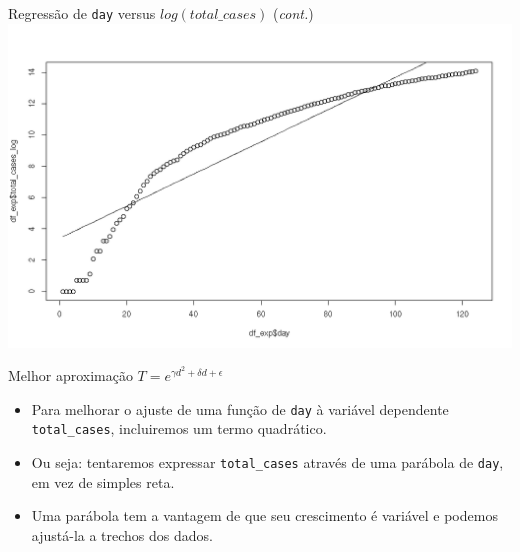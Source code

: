 \documentclass[a4paper,10pt]{beamer}
\begin{document}
\begin{frame}{ Regressão de {\tt day} versus $log(total\_cases)$
    ({\em cont.})}
  \includegraphics[scale=0.375]{plot-exp.png}
\end{frame}

%   
%   
% 
% 
% 

\begin{frame}{ Melhor aproximação $T = e^{\gamma d^2 + \delta d + \epsilon}$}
  \begin{itemize}
      \item Para melhorar o ajuste de uma função de {\tt day} à variável
	  dependente {\tt total\_cases}, incluiremos um termo quadrático.
      \item Ou seja: tentaremos expressar {\tt total\_cases} através de 
	  uma parábola de {\tt day}, em vez de simples reta.
      \item Uma parábola tem a vantagem de que seu crescimento é variável e 
	  podemos ajustá-la a trechos dos dados.
  \end{itemize}

\end{frame}
\end{document}
